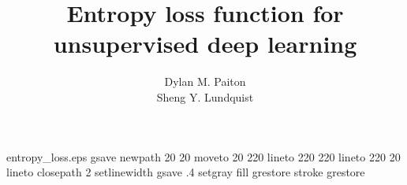 %
%
%

\begin{filecontents*}{entropy_loss.eps}
gsave
newpath
  20 20 moveto
  20 220 lineto
  220 220 lineto
  220 20 lineto
closepath
2 setlinewidth
gsave
  .4 setgray fill
grestore
stroke
grestore
\end{filecontents*}

\RequirePackage{fix-cm}

\documentclass[smallextended]{svjour3}       %

\smartqed  %

\usepackage{graphicx}
\usepackage{amsmath}
\usepackage{mathrsfs}

\newcommand{\argmin}{\operatornamewithlimits{argmin}}
\newcommand{\tightoverset}[2]{\mathop{#2}\limits^{\vbox to -.6ex{\kern-0.75ex\hbox{$#1$}\vss}}}



\title{Entropy loss function for unsupervised deep learning
}



\author{
Dylan M. Paiton\\
Sheng Y. Lundquist
}  



\maketitle

